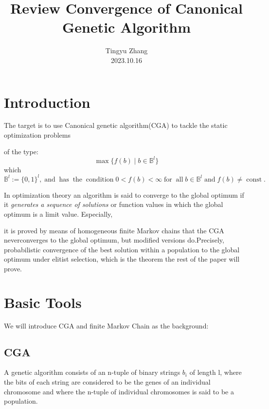 \documentclass{article}
\newcommand{\assign}{:=}
\newcommand{\tmaffiliation}[1]{\\ #1}
\newcommand{\tmem}[1]{{\em #1\/}}
\newcommand{\tmop}[1]{\ensuremath{\operatorname{#1}}}
\newcommand{\tmsamp}[1]{\textsf{#1}}
\newcommand{\tmstrong}[1]{\textbf{#1}}
\newcommand{\tmverbatim}[1]{\text{{\ttfamily{#1}}}}
\begin{document}
\title{Review Convergence of Canonical Genetic Algorithm}

\author{
  Tingyu Zhang
  \tmaffiliation{2023.10.16}
}

\maketitle

\section{Introduction}

The target is to use Canonical genetic algorithm(CGA) to tackle the static
optimization problems

of the type:
\begin{equation}
  \max \{ f (b) \mid b \in \mathbb{B}^l \}
\end{equation}
which $\mathbb{B}^l \assign \{ 0, 1 \}^l, \tmop{and} \tmop{has} \tmop{the}
\tmop{condition} 0 < f (b) < \infty \tmop{for} \tmop{all} b \in \mathbb{B}^l
\tmop{and} f (b) \neq \tmop{const} .$

In optimization theory an algorithm is said to converge to the global optimum
if it {\tmem{{\tmem{generates a sequence of
solutions{\tmstrong{\tmverbatim{{\tmsamp{}}}}}}}
{\tmstrong{\tmverbatim{}}}}}or function values in which the global optimum is
a limit value. Especially,

it is proved by means of homogeneous finite Markov chains that the CGA
neverconverges to the global optimum, but modified versions do.Precisely,
probabilistic convergence of the best solution within a population to the
global optimum under elitist selection, which is the theorem the rest of the
paper will prove.

\section{Basic Tools}

We will introduce CGA and finite Markov Chain as the background:

\subsection{CGA}

A genetic algorithm consists of an n-tuple of binary strings $b_i$ of length
l, where the bits of each string are considered to be the genes of an
individual chromosome and where the n-tuple of individual chromosomes is said
to be a population.
\end{document}
